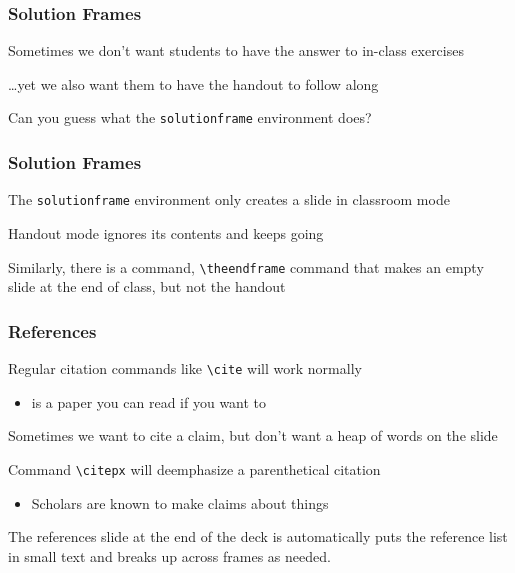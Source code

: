 \documentclass[aspectratio=169,handout]{beamer}
\begin{document}
\begin{frame}
	\frametitle{Solution Frames}
	\begin{witem}
		\item Sometimes we don't want students to have the answer to
			in-class exercises
		\item \dots yet we also want them to have the handout to follow along
		\item Can you guess what the \texttt{solutionframe} environment does?
	\end{witem}
\end{frame}


\begin{solutionframe}
	\frametitle{Solution Frames}
	\begin{witem}
		\item The \texttt{solutionframe} environment only creates a slide
			in classroom mode
		\item Handout mode ignores its contents and keeps going
		\item Similarly, there is a command, \texttt{\textbackslash{}theendframe} command
			that makes an empty slide at the end of class, but not the handout
	\end{witem}
\end{solutionframe}



\begin{frame}
	\frametitle{References}
	\begin{witem}
		\item Regular citation commands like \texttt{\textbackslash{}cite} will work normally
			\begin{itemize}
				\item \cite{DuquetteJMP} is a paper you can read if you want to
			\end{itemize}
		\item Sometimes we want to cite a claim, but don't want a heap of words on the slide
		\item Command \texttt{\textbackslash{}citepx} will deemphasize a parenthetical citation
			\begin{itemize}
				\item Scholars are known to make claims about things 
			\end{itemize}
		\item The references slide at the end of the deck is automatically puts the reference list
			in small text and breaks up across frames as needed.
	\end{witem}
\end{frame}
\end{document}
